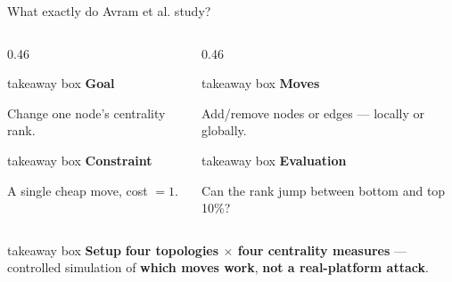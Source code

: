 \begin{frame}{What exactly do Avram et al. study?}
  \begin{columns}[T,onlytextwidth]
    \begin{column}{0.46\textwidth}
      \begin{beamercolorbox}[wd=\linewidth,rounded=true,sep=0.70em,ht=1.55cm]{takeaway box}
        {\color{PresFourAdversary}\bfseries Goal}\par
        \vspace{0.20em}
        Change one node's centrality rank.
      \end{beamercolorbox}
      \vspace{0.45em}
      \begin{beamercolorbox}[wd=\linewidth,rounded=true,sep=0.70em,ht=1.55cm]{takeaway box}
        {\color{PresFourAdversary}\bfseries Constraint}\par
        \vspace{0.20em}
        A single cheap move, cost $= 1$.
      \end{beamercolorbox}
    \end{column}
    \hspace{0.04\textwidth}
    \begin{column}{0.46\textwidth}
      \begin{beamercolorbox}[wd=\linewidth,rounded=true,sep=0.70em,ht=1.55cm]{takeaway box}
        {\color{PresFourAdversary}\bfseries Moves}\par
        \vspace{0.20em}
        Add/remove nodes or edges --- locally or globally.
      \end{beamercolorbox}
      \vspace{0.45em}
      \begin{beamercolorbox}[wd=\linewidth,rounded=true,sep=0.70em,ht=1.55cm]{takeaway box}
        {\color{PresFourAdversary}\bfseries Evaluation}\par
        \vspace{0.20em}
        Can the rank jump between bottom and top 10\%?
      \end{beamercolorbox}
    \end{column}
  \end{columns}
  \vspace{0.55cm}
  \begin{beamercolorbox}[wd=\linewidth,rounded=true,sep=0.55em]{takeaway box}
    {\footnotesize {\color{PresFourText}\bfseries Setup}\quad
    \textbf{four topologies $\times$ four centrality measures} ---
    controlled simulation of \textbf{which moves work}, \textbf{not a real-platform attack}.}
  \end{beamercolorbox}
  \vspace*{0.45cm}
\end{frame}
